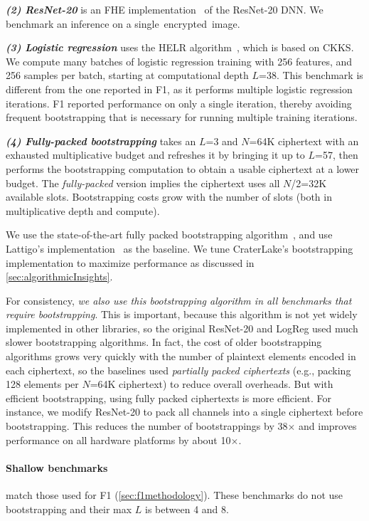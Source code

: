 \noindent \emph{\textbf{(2) ResNet-20}} is an FHE
implementation~\cite{lee:2021:privacy} of the ResNet-20 DNN. We benchmark an
inference on a single~encrypted~image.

\tblBenchmarksAndPerformanceBreakdown

\noindent \emph{\textbf{(3) Logistic regression}}
uses the HELR algorithm~\cite{han:aaai19:logistic}, which is based on CKKS. We
compute many batches of logistic regression training with 256 features, and 256
samples per batch, starting at computational depth $L$=38. This benchmark is
different from the one reported in F1, as it performs multiple logistic
regression iterations. F1 reported performance on only a single iteration,
thereby avoiding frequent bootstrapping that is necessary for running multiple
training iterations.

\noindent \emph{\textbf{(4) Fully-packed bootstrapping}}
takes an $L$=3 and $N$=64K ciphertext with an exhausted multiplicative budget
and refreshes it by bringing it up to $L$=57, then performs the bootstrapping
computation to obtain a usable ciphertext at a lower budget. The
\emph{fully-packed} version implies the ciphertext uses all $N$/2=32K available
slots. Bootstrapping costs grow with the number of slots (both in
multiplicative depth and compute).

We use the state-of-the-art fully packed bootstrapping
algorithm~\cite{mouchet2020lattigo}, and use Lattigo's
implementation~\cite{lattigo} as the baseline. We tune CraterLake's
bootstrapping implementation to maximize performance as discussed in
\autoref{sec:algorithmicInsights}.

For consistency, \emph{we also use this bootstrapping algorithm in all
benchmarks that require bootstrapping}. This is important, because this
algorithm is not yet widely implemented in other libraries, so the original
ResNet-20 and LogReg used much slower bootstrapping algorithms. In fact, the
cost of older bootstrapping algorithms grows very quickly with the number of
plaintext elements encoded in each ciphertext, so the baselines used
\emph{partially packed ciphertexts} (e.g., packing 128 elements per $N$=64K
ciphertext) to reduce overall overheads. But with efficient bootstrapping,
using fully packed ciphertexts is more efficient. For instance, we modify
ResNet-20 to pack all channels into a single ciphertext before bootstrapping.
This reduces the number of bootstrappings by 38$\times$ and improves
performance on all hardware platforms by about 10$\times$.

\paragraph{Shallow benchmarks} match those used for F1
(\autoref{sec:f1methodology}). These benchmarks do not use bootstrapping and
their max $L$ is between 4 and 8.

